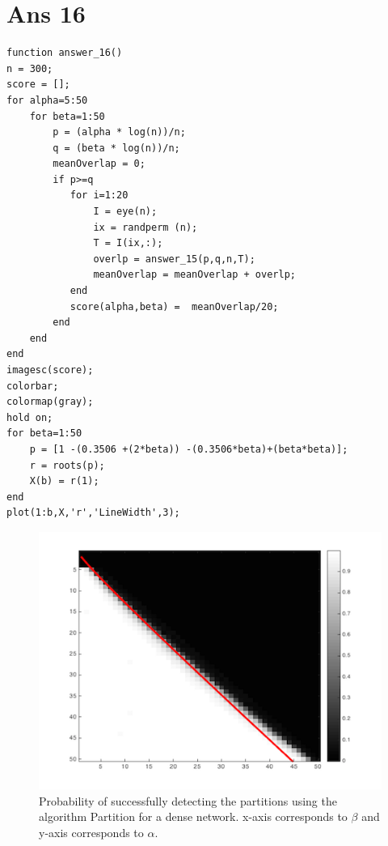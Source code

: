 \documentclass[10pt]{article}
\begin{document}
\section*{Ans 16}
\begin{flushleft}
\begin{lstlisting}
function answer_16()
n = 300;
score = [];
for alpha=5:50
    for beta=1:50
        p = (alpha * log(n))/n;
        q = (beta * log(n))/n;
        meanOverlap = 0;
        if p>=q
           for i=1:20
               I = eye(n);
               ix = randperm (n);
               T = I(ix,:);
               overlp = answer_15(p,q,n,T);
               meanOverlap = meanOverlap + overlp;
           end
           score(alpha,beta) =  meanOverlap/20;
        end 
    end
end
imagesc(score);
colorbar;
colormap(gray);
hold on;
for beta=1:50
    p = [1 -(0.3506 +(2*beta)) -(0.3506*beta)+(beta*beta)];
    r = roots(p);
    X(b) = r(1);
end
plot(1:b,X,'r','LineWidth',3);
\end{lstlisting}
\begin{figure}[!htb]
\includegraphics{16.png}
\caption{Probability of successfully detecting the partitions using the algorithm Partition for a dense network. x-axis corresponds to $\beta$ and y-axis corresponds to $\alpha$.}
\end{figure}
\end{flushleft}
\vspace{20em}
\end{document}
